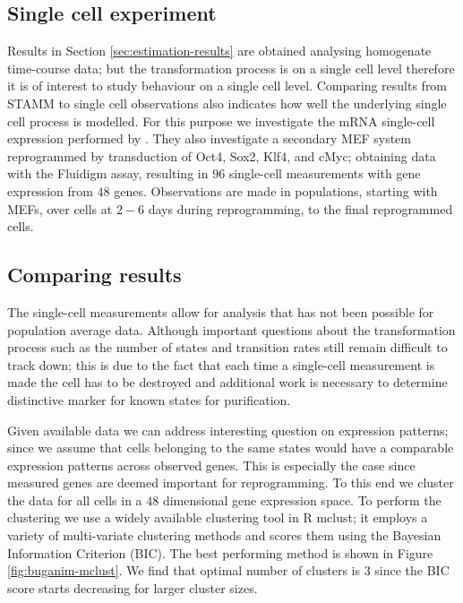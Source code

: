 \subsection{Single cell experiment}
\label{sec:single-cell-exper}

Results in Section \ref{sec:estimation-results} are obtained analysing homogenate time-course data; but the transformation process is on a single cell level therefore it is of interest to study behaviour on a single cell level. Comparing results from STAMM to single cell observations also indicates how well the underlying single cell process is modelled. For this purpose we investigate the mRNA single-cell expression performed by \cite{Buganim:2012hp}. They also investigate a secondary MEF system reprogrammed by transduction of Oct4, Sox2, Klf4, and cMyc; obtaining data with the Fluidigm assay, resulting in $96$ single-cell measurements with gene expression from $48$ genes. Observations are made in populations, starting with MEFs, over cells at $2 - 6$ days during reprogramming, to the final reprogrammed cells.

\subsection{Comparing results}
\label{sec:comparing-results}

The single-cell measurements \citep{Buganim:2012hp} allow for analysis that has not been possible for population average data. Although important questions about the transformation process such as the number of states and transition rates still remain difficult to track down; this is due to the fact that each time a single-cell measurement is made the cell has to be destroyed and additional work is necessary to determine distinctive marker for known states for purification. 

Given available data we can address interesting question on expression patterns; since we assume that cells belonging to the same states would have a comparable expression patterns across observed genes. This is especially the case since measured genes are deemed important for reprogramming. To this end we cluster the data for all cells in a $48$ dimensional gene expression space. To perform the clustering we use a widely available clustering tool in R mclust; it employs a variety of multi-variate clustering methods and scores them using the Bayesian Information Criterion (BIC). The best performing method is shown in Figure \ref{fig:buganim-mclust}. We find that optimal number of clusters is $3$ since the BIC score starts decreasing for larger cluster sizes. 

